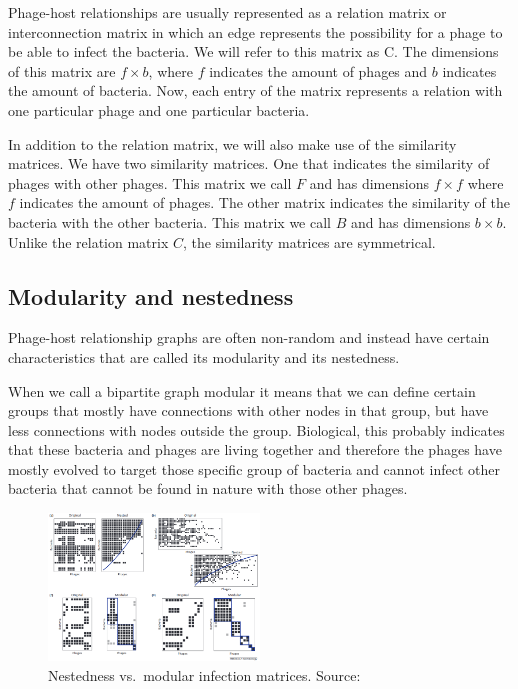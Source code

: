 \documentclass{article}
\begin{document}
Phage-host relationships are usually represented as a relation matrix or interconnection 
matrix in which 
an edge represents the possibility for a phage to be able to infect the 
bacteria. We will refer to this matrix as C. The dimensions of this matrix are
$f \times b$, where $f$ indicates the amount of phages and $b$ indicates the amount
of bacteria. Now, each entry of the matrix represents a relation with one particular
phage and one particular bacteria. 

In addition to the relation matrix, we will also make use of the similarity matrices.
We have two similarity matrices. One that indicates the similarity of phages
with other phages. This matrix we call $F$ and has dimensions $f \times f$ 
where $f$ indicates the 
amount of phages. The other matrix indicates the similarity
of the bacteria with the other bacteria. This matrix we call $B$ and has
dimensions $b \times b$. Unlike the relation matrix $C$, the similarity matrices
are symmetrical. 

\subsection{Modularity and nestedness}

Phage-host relationship graphs are often non-random and instead have certain 
characteristics that are called its modularity and its nestedness. 

When we call a bipartite graph modular it means that we can define certain
groups that mostly have connections with other nodes in that group, but have less
connections with nodes outside the group. Biological, this probably indicates
that these bacteria and phages are living together and therefore the phages
have mostly evolved to target those specific group of bacteria and cannot
infect other bacteria that cannot be found in nature with those other phages. 

\begin{figure}[ht]
\centering
\includegraphics[width=0.5\textwidth]{img/nested-vs-modular.png}
\caption{Nestedness vs.\ modular infection matrices. Source:~\cite{weitz2013phage}}
\end{figure}
\end{document}
